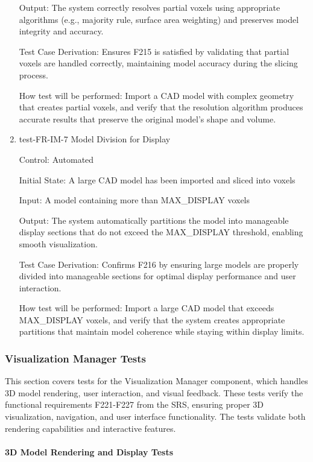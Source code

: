 \documentclass[12pt, titlepage]{article}
\begin{document}
\begin{enumerate}
Output: The system correctly resolves partial voxels using appropriate algorithms (e.g.,
majority rule, surface area weighting) and preserves model integrity and accuracy.

Test Case Derivation: Ensures F215 is satisfied by validating that partial voxels are handled
correctly, maintaining model accuracy during the slicing process.
					
How test will be performed: Import a CAD model with complex geometry that creates partial
voxels, and verify that the resolution algorithm produces accurate results that preserve
the original model's shape and volume.

\item{test-FR-IM-7 Model Division for Display\\}

Control: Automated
					
Initial State: A large CAD model has been imported and sliced into voxels
					
Input: A model containing more than MAX\_DISPLAY voxels
					
Output: The system automatically partitions the model into manageable display sections
that do not exceed the MAX\_DISPLAY threshold, enabling smooth visualization.

Test Case Derivation: Confirms F216 by ensuring large models are properly divided into
manageable sections for optimal display performance and user interaction.
					
How test will be performed: Import a large CAD model that exceeds MAX\_DISPLAY voxels,
and verify that the system creates appropriate partitions that maintain model coherence
while staying within display limits.

\end{enumerate}

\subsubsection{Visualization Manager Tests}

This section covers tests for the Visualization Manager component, which handles 3D model
rendering, user interaction, and visual feedback. These tests verify the functional requirements
F221-F227 from the SRS, ensuring proper 3D visualization, navigation, and user interface
functionality. The tests validate both rendering capabilities and interactive features.

\paragraph{3D Model Rendering and Display Tests}
\end{document}
